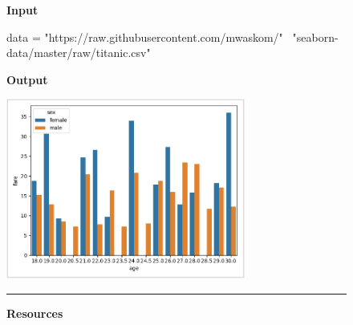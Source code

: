 \begin{figure}
\begin{mdframed}[backgroundcolor=gray!04] 
\begin{scriptsize}



\textbf{Input} 


\begin{python}
data = "https://raw.githubusercontent.com/mwaskom/" \
  "seaborn-data/master/raw/titanic.csv"
\end{python}

\textbf{Output}


\begin{center}
  \includegraphics[width=0.7\textwidth]{appendix/cp6/titanic-chart.png}
\end{center}


\begin{center}
\rule{10cm}{0.4pt}
\end{center}
  


\textbf{Resources}


\end{scriptsize}
\end{mdframed}
\end{figure}

